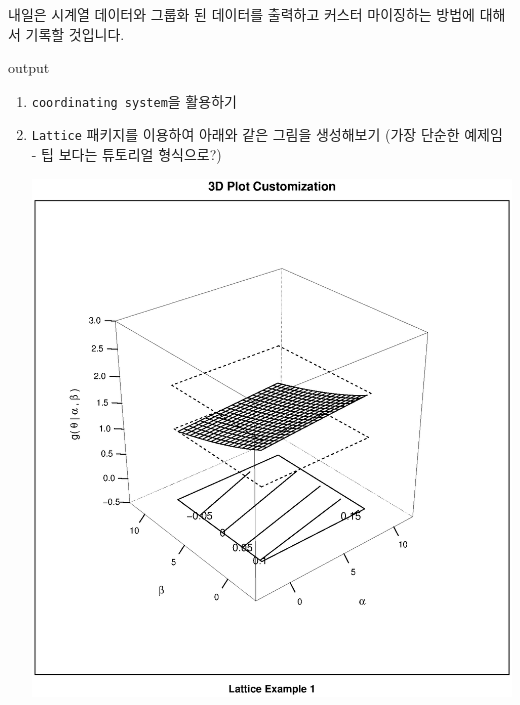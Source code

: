 내일은 시계열 데이터와 그룹화 된 데이터를 출력하고 커스터 마이징하는 방법에 대해서 기록할 것입니다.


\begin{Schunk}
\begin{Soutput}
output
\end{Soutput}
\end{Schunk}

\begin{enumerate}

\item \texttt{coordinating system}을 활용하기

\item \texttt{Lattice} 패키지를 이용하여 아래와 같은 그림을 생성해보기 (가장 단순한 예제임 - 팁 보다는 튜토리얼 형식으로?)

\includegraphics{./img/lattice-fig.eps}



\end{enumerate}
